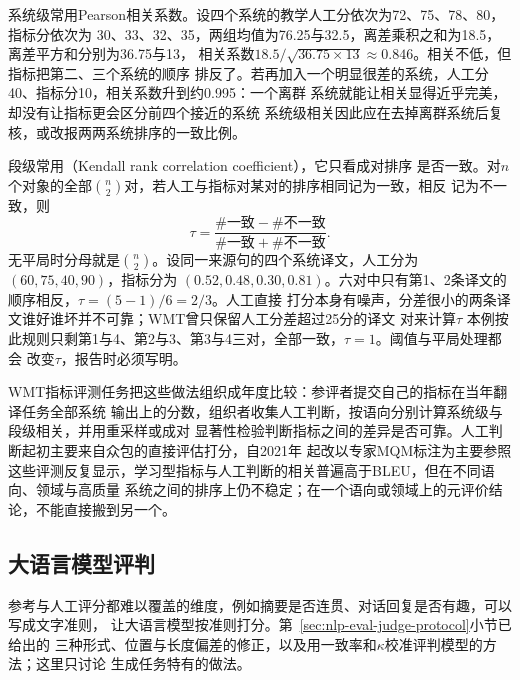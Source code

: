 系统级常用Pearson相关系数。设四个系统的教学人工分依次为72、75、78、80，指标分依次为
30、33、32、35，两组均值为76.25与32.5，离差乘积之和为18.5，离差平方和分别为36.75与13，
相关系数$18.5/\sqrt{36.75\times13}\approx0.846$。相关不低，但指标把第二、三个系统的顺序
排反了。若再加入一个明显很差的系统，人工分40、指标分10，相关系数升到约0.995：一个离群
系统就能让相关显得近乎完美，却没有让指标更会区分前四个接近的系统
系统级相关因此应在去掉离群系统后复核，或改报两两系统排序的一致比例。

段级常用（Kendall rank correlation coefficient），它只看成对排序
是否一致。对$n$个对象的全部$\binom n2$对，若人工与指标对某对的排序相同记为一致，相反
记为不一致，则
\begin{equation}
  \tau=\frac{\#\text{一致}-\#\text{不一致}}{\#\text{一致}+\#\text{不一致}} .
  \label{eq:nlp-generation-kendall}
\end{equation}
无平局时分母就是$\binom n2$。设同一来源句的四个系统译文，人工分为$(60,75,40,90)$，指标分为
$(0.52,0.48,0.30,0.81)$。六对中只有第1、2条译文的顺序相反，$\tau=(5-1)/6=2/3$。人工直接
打分本身有噪声，分差很小的两条译文谁好谁坏并不可靠；WMT曾只保留人工分差超过25分的译文
对来计算$\tau$
本例按此规则只剩第1与4、第2与3、第3与4三对，全部一致，$\tau=1$。阈值与平局处理都会
改变$\tau$，报告时必须写明。

WMT指标评测任务把这些做法组织成年度比较：参评者提交自己的指标在当年翻译任务全部系统
输出上的分数，组织者收集人工判断，按语向分别计算系统级与段级相关，并用重采样或成对
显著性检验判断指标之间的差异是否可靠。人工判断起初主要来自众包的直接评估打分，自2021年
起改以专家MQM标注为主要参照
这些评测反复显示，学习型指标与人工判断的相关普遍高于BLEU，但在不同语向、领域与高质量
系统之间的排序上仍不稳定；在一个语向或领域上的元评价结论，不能直接搬到另一个。

\subsection{大语言模型评判}
\label{sec:nlp-generation-llm-judge}

参考与人工评分都难以覆盖的维度，例如摘要是否连贯、对话回复是否有趣，可以写成文字准则，
让大语言模型按准则打分。第~\ref{sec:nlp-eval-judge-protocol}小节已给出的
三种形式、位置与长度偏差的修正，以及用一致率和$\kappa$校准评判模型的方法；这里只讨论
生成任务特有的做法。

